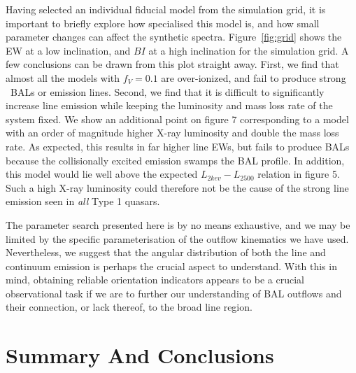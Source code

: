 \documentclass[useAMS,usenatbib]{mn2e_x}
\begin{document}
Having selected an individual fiducial model from the simulation grid, it is important
to briefly explore how specialised this model is, and how small parameter
changes can affect the synthetic spectra. Figure~\ref{fig:grid}
shows the EW at a low inclination, and $BI$ at a high inclination for the simulation
grid. A few conclusions can be drawn from this plot straight away. 
First, we find that almost all the models with $f_V=0.1$ are over-ionized, and 
fail to produce strong \civ\ BALs or emission lines. Second, we find that 
it is difficult to significantly increase line emission while
keeping the luminosity and mass loss rate of the system fixed. 
We show an additional point on figure 7 corresponding to a model with an order of
magnitude higher X-ray luminosity and double the mass loss rate. As expected, 
this results in far higher line EWs, but fails to produce BALs because
the collisionally excited emission swamps the BAL profile. In addition,
this model would lie well above the expected $L_{2kev}-L_{2500}$ 
relation in figure 5. Such a high X-ray luminosity could therefore 
not be the cause of the strong line emission seen in {\em all} Type 1 quasars.

The parameter search presented here is by no means exhaustive, and
we may be limited by the specific parameterisation of the outflow 
kinematics we have used. Nevertheless, we suggest that the angular distribution
of both the line and continuum emission is perhaps the crucial 
aspect to understand. With this in mind, obtaining reliable orientation 
indicators appears to be a crucial observational task if we are to
further our understanding of BAL outflows 
and their connection, or lack thereof, to the 
broad line region. 




\section{Summary And Conclusions}
\end{document}
